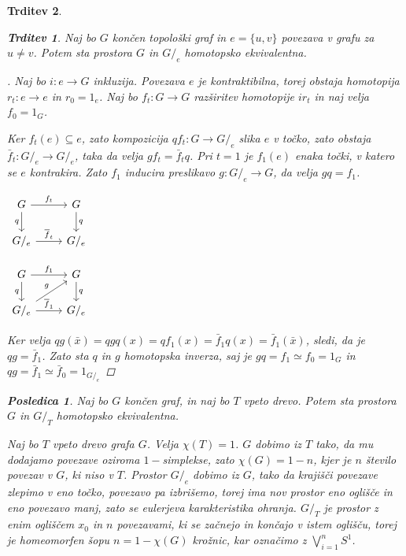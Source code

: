 \documentclass[a4paper,12pt]{article}
\theoremstyle{definition}
\theoremstyle{plain}
\theoremstyle{definition}
\theoremstyle{plain}
\newtheorem{trditev}{Trditev}
\theoremstyle{plain}
\newtheorem{posledica}{Posledica}
\theoremstyle{plain}
\theoremstyle{plain}
\newenvironment{dokaz}{\begin{proof}[\bfseries\upshape\proofname]}{\end{proof}}
\begin{document}
\begin{trditev}
\begin{trditev}
    Naj bo $G$ končen topološki graf in  $e=\{u,v\}$ povezava v grafu za $u\neq v$. Potem sta prostora $G$ in $G/_e$ homotopsko ekvivalentna.
\end{trditev}

\begin{dokaz}
    Naj bo $i:e\rightarrow G$ inkluzija. Povezava $e$ je kontraktibilna, torej obstaja homotopija $r_t:e \rightarrow e$ in $r_0=1_e$. Naj bo $f_t:G\rightarrow G$ razširitev homotopije $ir_t$ in naj velja $f_0=1_G$.

    Ker $f_t(e)\subseteq e$, zato kompozicija $qf_t:G\rightarrow G/_e$ slika $e$ v točko, zato obstaja $\bar{f}_t:G/_e\rightarrow G/_e$, taka da velja $gf_t=\bar{f}_tq$. Pri $t=1$ je $f_1(e)$ enaka točki, v katero se $e$ kontrakira. Zato $f_1$ inducira preslikavo $g:G/_e \rightarrow G$, da velja $gq=f_1$.
    \begin{minipage}{0.2\textwidth}
        \centering
        $\begin{tikzcd}
            {G}\arrow{r}{f_t} \arrow[swap]{d}{q} & {G} \arrow{d}{q} \\
            G/_e \arrow{r}{\overline{f}_t} & G/_e
        \end{tikzcd}
        $
    \end{minipage}
    \begin{minipage}{0.4\textwidth}
        \centering
        $\begin{tikzcd}
            {G}\arrow{r}{f_1} \arrow[swap]{d}{q} & {G} \arrow{d}{q} \\
            G/_e \arrow{ru}{g} \arrow{r}{\overline{f}_1} & G/_e
        \end{tikzcd}
        $
    \end{minipage}
    
    Ker velja $qg(\bar{x})=qgq(x)=qf_1(x)=\bar{f}_1 q(x)=\bar{f}_1(\bar{x})$, sledi, da je $qg=\bar{f}_1$. Zato sta $q$ in $g$ homotopska inverza, saj je $gq=f_1\simeq f_0=1_G$ in $qg=\bar{f}_1\simeq \bar{f}_0 = 1_{G/_e}$
\end{dokaz}

\begin{posledica}
    Naj bo $G$ končen graf, in naj bo $T$ vpeto drevo. Potem sta 
    prostora $G$ in $G/_T$ homotopsko ekvivalentna.
\end{posledica}

Naj bo $T$ vpeto drevo grafa $G$. Velja $\chi(T)=1$. $G$ dobimo iz $T$ tako, da mu dodajamo povezave 
oziroma $1-$simplekse, zato $\chi(G)=1-n$, kjer je $n$ število povezav v $G$, ki niso v 
$T$. Prostor $G/_e$ dobimo iz $G$, tako da krajišči povezave zlepimo v eno točko, povezavo pa 
izbrišemo, torej ima nov prostor eno oglišče in eno povezavo manj, zato se eulerjeva karakteristika 
ohranja. $G/_T$ je prostor z enim ogliščem $x_0$ in $n$ povezavami, ki se začnejo in končajo v istem 
oglišču, torej je homeomorfen šopu $n=1-\chi(G)$ krožnic, kar označimo z $\bigvee\limits_{i=1}^{n}S^1$.


\end{trditev}
\end{document}
